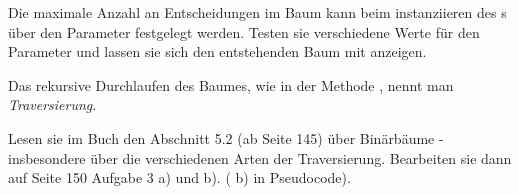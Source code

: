 \documentclass[10pt, a4paper]{scrartcl}
\begin{document}
\begin{aufgabe}
	Die maximale Anzahl an Entscheidungen im Baum kann beim instanziieren des s
	über den Parameter  festgelegt werden. Testen sie verschiedene Werte für
	den Parameter und lassen sie sich den entstehenden Baum mit  anzeigen.
\end{aufgabe}

\begin{aufgabe}
	Das rekursive Durchlaufen des Baumes, wie in der Methode , nennt man
	\emph{Traversierung}.
	
	Lesen sie im Buch den Abschnitt 5.2 (ab Seite 145) über Binärbäume - insbesondere über die 
	verschiedenen Arten der Traversierung. Bearbeiten sie dann auf Seite 150 Aufgabe 3 a) und b).
	( b) in Pseudocode).
\end{aufgabe}
\end{document}

